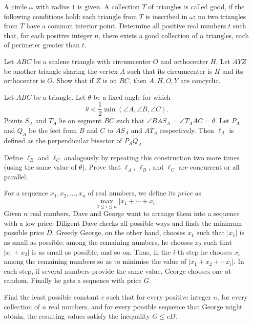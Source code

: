 \documentclass[11pt]{scrartcl}
\begin{document}
\begin{problem}[2265193939454652363]
	A circle $\omega$ with radius $1$ is given. A collection $T$ of triangles is called good, if the following conditions hold:
each triangle from $T$ is inscribed in $\omega$;
no two triangles from $T$ have a common interior point.
Determine all positive real numbers $t$ such that, for each positive integer $n$, there exists a good collection of $n$ triangles, each of perimeter greater than $t$.
\end{problem}
\begin{problem}[4948608980214807448]
	Let $ABC$ be a scalene triangle with circumcenter $O$ and orthocenter $H$. Let $AYZ$ be another triangle sharing the vertex $A$ such that its circumcenter is $H$ and its orthocenter is $O$. Show that if $Z$ is on $BC$, then $A,H,O,Y$ are concyclic.
\end{problem}
\begin{problem}[23047452603115]
Let $ABC$ be a triangle. Let $\theta$ be a fixed angle for which\[\theta<\frac12\min(\angle A,\angle B,\angle C).\]Points $S_A$ and $T_A$ lie on segment $BC$ such that $\angle BAS_A=\angle T_AAC=\theta$. Let $P_A$ and $Q_A$ be the feet from $B$ and $C$ to $\overline{AS_A}$ and $\overline{AT_A}$ respectively. Then $\ell_A$ is defined as the perpendicular bisector of $\overline{P_AQ_A}$.

Define $\ell_B$ and $\ell_C$ analogously by repeating this construction two more times (using the same value of $\theta$). Prove that $\ell_A$, $\ell_B$, and $\ell_C$ are concurrent or all parallel.
\end{problem}
\begin{problem}[557323499571799]
For a sequence $x_1,x_2,\ldots,x_n$ of real numbers, we define its $\textit{price}$ as\[\max_{1\le i\le n}|x_1+\cdots +x_i|.\]Given $n$ real numbers, Dave and George want to arrange them into a sequence with a low price. Diligent Dave checks all possible ways and finds the minimum possible price $D$. Greedy George, on the other hand, chooses $x_1$ such that $|x_1 |$ is as small as possible; among the remaining numbers, he chooses $x_2$ such that $|x_1 + x_2 |$ is as small as possible, and so on. Thus, in the $i$-th step he chooses $x_i$ among the remaining numbers so as to minimise the value of $|x_1 + x_2 + \cdots  x_i |$. In each step, if several numbers provide the same value, George chooses one at random. Finally he gets a sequence with price $G$.

Find the least possible constant $c$ such that for every positive integer $n$, for every collection of $n$ real numbers, and for every possible sequence that George might obtain, the resulting values satisfy the inequality $G\le cD$.
\end{problem}
\end{document}
